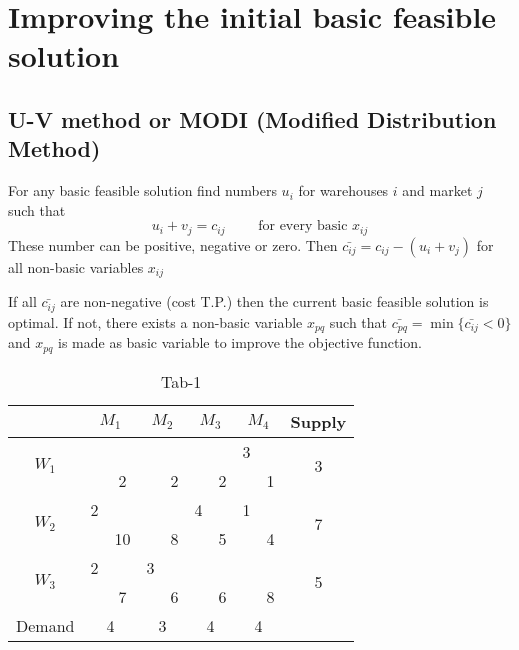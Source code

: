 \documentclass[../main-sheet.tex]{subfiles}
\begin{document}
\section{Improving the initial basic feasible solution}
\subsection{U-V method or MODI (Modified Distribution Method)}
For any basic feasible solution find numbers \(u_i\) for warehouses \(i\) and market \(j\) such that
\[u_i+v_j=c_{ij}\qquad \text{ for every basic }x_{ij}\]
These number can be positive, negative or zero. Then \(\bar{c_{ij}}=c_{ij}-(u_i+v_j)\) for all non-basic variables \(x_{ij}\)

If all \(\bar{c_{ij}}\) are non-negative (cost T.P.) then the current basic feasible solution is optimal. If not, there exists a non-basic variable \(x_{pq}\) such that \(\bar{c_{pq}}=\min\{\bar{c_{ij}}<0\}\) and \(x_{pq}\) is made as basic variable to improve the objective function.
\begin{table}[H]
    \centering
    \begin{tabular}{|c|cc|cc|cc|cc|c|}
    \hline
                           & \multicolumn{2}{c|}{$M_1$} & \multicolumn{2}{c|}{$M_2$} & \multicolumn{2}{c|}{$M_3$} & \multicolumn{2}{c|}{$M_4$} & Supply             \\ \hline
    \multirow{2}{*}{$W_1$} &                       &    &                        &   &                        &   & 3                      &   & \multirow{2}{*}{3} \\ \cline{3-3} \cline{5-5} \cline{7-7} \cline{9-9}
                           & \multicolumn{1}{c|}{} & 2  & \multicolumn{1}{c|}{}  & 2 & \multicolumn{1}{c|}{}  & 2 & \multicolumn{1}{c|}{}  & 1 &                    \\ \hline
    \multirow{2}{*}{$W_2$} & 2                     &    &                        &   & 4                      &   & 1                      &   & \multirow{2}{*}{7} \\ \cline{3-3} \cline{5-5} \cline{7-7} \cline{9-9}
                           & \multicolumn{1}{c|}{} & 10 & \multicolumn{1}{c|}{}  & 8 & \multicolumn{1}{c|}{}  & 5 & \multicolumn{1}{c|}{}  & 4 &                    \\ \hline
    \multirow{2}{*}{$W_3$} & 2                     &    & 3                      &   &                        &   &                        &   & \multirow{2}{*}{5} \\ \cline{3-3} \cline{5-5} \cline{7-7} \cline{9-9}
                           & \multicolumn{1}{c|}{} & 7  & \multicolumn{1}{c|}{}  & 6 & \multicolumn{1}{c|}{}  & 6 & \multicolumn{1}{c|}{}  & 8 &                    \\ \hline
    Demand                 & \multicolumn{2}{c|}{4}     & \multicolumn{2}{c|}{3}     & \multicolumn{2}{c|}{4}     & \multicolumn{2}{c|}{4}     &                    \\ \hline
    \end{tabular}
    \caption{Tab-1}
\end{table}
\end{document}
